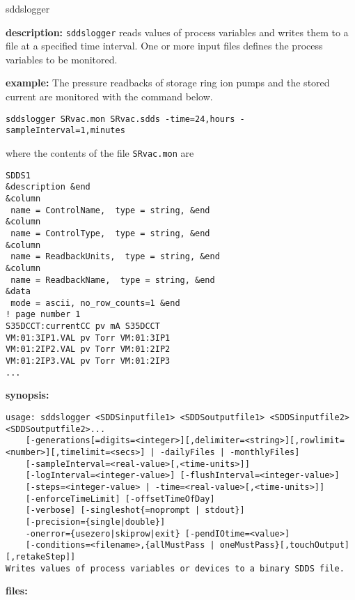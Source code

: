 %
%
\begin{sddsprog}{sddslogger}
\item {\bf description:}
%
%
\verb+sddslogger+ reads values of process variables and writes them to a file at a specified time interval.
One or more input files defines the process variables to be monitored.
\item {\bf example:} 
%
% 
%
The pressure readbacks of storage ring ion pumps and the stored current are monitored
with the command below.
\begin{verbatim}
sddslogger SRvac.mon SRvac.sdds -time=24,hours -sampleInterval=1,minutes
\end{verbatim}
where the contents of the file \verb+SRvac.mon+ are
\begin{verbatim}
SDDS1
&description &end
&column
 name = ControlName,  type = string, &end
&column
 name = ControlType,  type = string, &end
&column
 name = ReadbackUnits,  type = string, &end
&column
 name = ReadbackName,  type = string, &end
&data
 mode = ascii, no_row_counts=1 &end
! page number 1
S35DCCT:currentCC pv mA S35DCCT
VM:01:3IP1.VAL pv Torr VM:01:3IP1
VM:01:2IP2.VAL pv Torr VM:01:2IP2 
VM:01:2IP3.VAL pv Torr VM:01:2IP3 
...
\end{verbatim}
\item {\bf synopsis:} 
%
%
\begin{verbatim}
usage: sddslogger <SDDSinputfile1> <SDDSoutputfile1> <SDDSinputfile2> <SDDSoutputfile2>...
    [-generations[=digits=<integer>][,delimiter=<string>][,rowlimit=<number>][,timelimit=<secs>] | -dailyFiles | -monthlyFiles]
    [-sampleInterval=<real-value>[,<time-units>]]
    [-logInterval=<integer-value>] [-flushInterval=<integer-value>]
    [-steps=<integer-value> | -time=<real-value>[,<time-units>]]
    [-enforceTimeLimit] [-offsetTimeOfDay]
    [-verbose] [-singleshot{=noprompt | stdout}]
    [-precision={single|double}]
    -onerror={usezero|skiprow|exit} [-pendIOtime=<value>]
    [-conditions=<filename>,{allMustPass | oneMustPass}[,touchOutput][,retakeStep]]
Writes values of process variables or devices to a binary SDDS file.
\end{verbatim}
\item {\bf files:}

\end{sddsprog}
